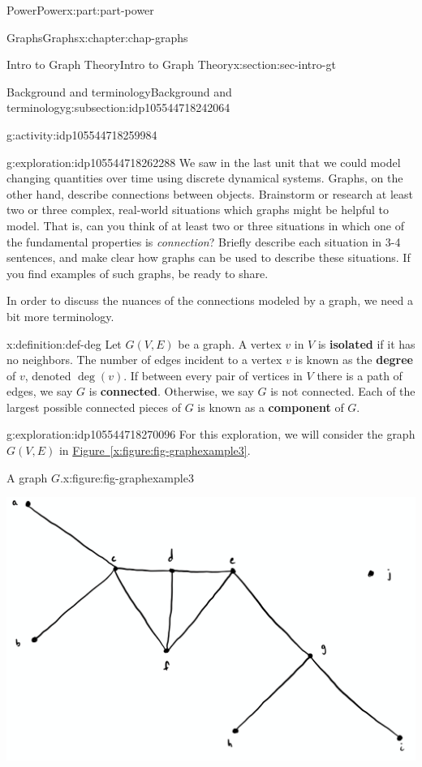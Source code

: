 \documentclass[oneside,10pt,]{book}
\newcommand{\xreffont}{\relax}
\newcommand{\terminology}[1]{\textbf{#1}}
\numberwithin{equation}{section}
\begin{document}
\begin{partptx}{Power}{}{Power}{}{}{x:part:part-power}
\begin{chapterptx}{Graphs}{}{Graphs}{}{}{x:chapter:chap-graphs}
\begin{sectionptx}{Intro to Graph Theory}{}{Intro to Graph Theory}{}{}{x:section:sec-intro-gt}
\begin{subsectionptx}{Background and terminology}{}{Background and terminology}{}{}{g:subsection:idp105544718242064}
\begin{activity}{}{g:activity:idp105544718259984}
\begin{enumerate}
\end{enumerate}
\end{activity}%
\begin{exploration}{}{g:exploration:idp105544718262288}%
We saw in the last unit that we could model changing quantities over time using discrete dynamical systems. Graphs, on the other hand, describe connections between objects. Brainstorm or research at least two or three complex, real-world situations which graphs might be helpful to model. That is, can you think of at least two or three situations in which one of the fundamental properties is \emph{connection}? Briefly describe each situation in 3-4 sentences, and make clear how graphs can be used to describe these situations. If you find examples of such graphs, be ready to share.%
\end{exploration}%
In order to discuss the nuances of the connections modeled by a graph, we need a bit more terminology.%
\begin{definition}{}{x:definition:def-deg}%
Let \(G(V,E)\) be a graph. A vertex \(v\) in \(V\) is \terminology{isolated} if it has no neighbors. The number of edges incident to a vertex \(v\) is known as the \terminology{degree} of \(v\), denoted \(\deg(v)\). If between every pair of vertices in \(V\) there is a path of edges, we say \(G\) is \terminology{connected}. Otherwise, we say \(G\) is not connected. Each of the largest possible connected pieces of \(G\) is known as a \terminology{component} of \(G\).%
\end{definition}
\begin{exploration}{}{g:exploration:idp105544718270096}%
For this exploration, we will consider the graph \(G(V,E)\) in \hyperref[x:figure:fig-graphexample3]{Figure~{\xreffont\ref{x:figure:fig-graphexample3}}}.%
\begin{figureptx}{A graph \(G\).}{x:figure:fig-graphexample3}{}%
\begin{image}{0.25}{0.5}{0.25}%
\includegraphics[width=\linewidth]{images/graph03.png}

\end{image}
\end{figureptx}
\end{exploration}
\end{subsectionptx}
\end{sectionptx}
\end{chapterptx}
\end{partptx}
\end{document}
